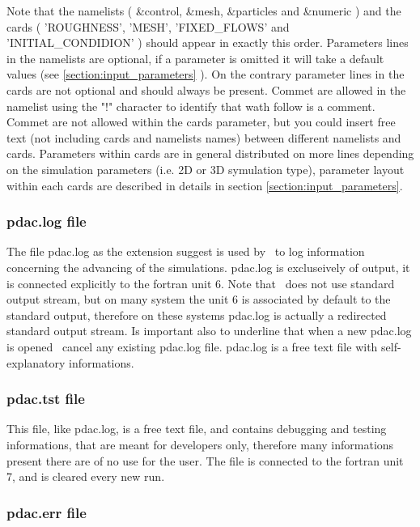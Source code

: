 Note that the namelists ( \&control, \&mesh, \&particles and \&numeric )
and the cards ( 'ROUGHNESS', 'MESH', 'FIXED\_FLOWS' and 'INITIAL\_CONDIDION' )
should appear in exactly this order. 
Parameters lines in the namelists are optional, if a parameter is omitted
it will take a default values (see \ref{section:input_parameters} ).
On the contrary parameter lines in the cards are not optional and
should always be present.
Commet are allowed in the namelist using the "!" character to identify 
that wath follow is a comment. Commet are not allowed within the cards
parameter, but you could insert free text (not including cards and namelists names)
between different namelists and cards.
Parameters within cards are in general distributed on more lines depending
on the simulation parameters (i.e. 2D or 3D symulation type), parameter layout 
within each cards are described in details in section \ref{section:input_parameters}.

\subsubsection{pdac.log file}
\label{section:padc_log}

The file pdac.log as the extension suggest is used by \PDAC\ to log information
concerning the advancing of the simulations. pdac.log is excluseively of
output, it is connected explicitly to the fortran unit 6. Note that \PDAC\ 
does not use standard output stream, but on many
system the unit 6 is associated by default to the standard output, therefore
on these systems pdac.log is actually a redirected standard output stream.
Is important also to underline that when a new pdac.log is opened \PDAC\ cancel 
any existing pdac.log file.
pdac.log is a free text file with self-explanatory informations.

\subsubsection{pdac.tst file}
\label{section:padc_tst}

This file, like pdac.log, is a free text file, and contains debugging
and testing informations, that are meant for developers only,
therefore many informations present there are of no use for the user.
The file is connected to the fortran unit 7, and is cleared every new run.

\subsubsection{pdac.err file}
\label{section:padc_err}


